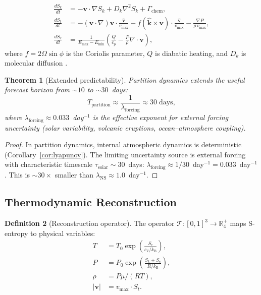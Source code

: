 \documentclass[10pt,twocolumn]{article}
\newtheorem{theorem}{Theorem}[section]
\theoremstyle{definition}
\newtheorem{definition}[theorem]{Definition}
\theoremstyle{remark}
\newcommand{\R}{\mathbb{R}}
\newcommand{\kB}{k_{\mathrm{B}}}
\newcommand{\Sk}{S_k}
\newcommand{\St}{S_t}
\newcommand{\Se}{S_e}
\begin{document}
\begin{align}
  \frac{d\Sk}{dt}
  &= -\mathbf{v}\cdot\nabla\Sk + D_k\nabla^2\Sk
    + \Gamma_{\mathrm{chem}},\label{eq:dSk}\\
  \frac{d\St}{dt}
  &= -(\mathbf{v}\cdot\nabla)\mathbf{v}\cdot
    \frac{\hat{\mathbf{v}}}{v_{\max}}
    - f(\hat{\mathbf{k}}\times\mathbf{v})\cdot
    \frac{\hat{\mathbf{v}}}{v_{\max}}
    - \frac{\nabla P}{\rho\,v_{\max}},\label{eq:dSt}\\
  \frac{d\Se}{dt}
  &= \frac{1}{E_{\max}-E_{\min}}
    \left(\frac{Q}{c_p}-\frac{P}{\rho}\nabla\cdot\mathbf{v}
    \right),\label{eq:dSe}
\end{align}
where $f=2\Omega\sin\phi$ is the Coriolis parameter, $Q$ is
diabatic heating, and $D_k$ is molecular diffusion
\citep{Holton2013}.

\begin{theorem}[Extended predictability]\label{thm:predict}
Partition dynamics extends the useful forecast horizon from
${\sim}10$ to ${\sim}30$~days:
\begin{equation}\label{eq:predict}
  T_{\mathrm{partition}}
  \approx\frac{1}{\lambda_{\mathrm{forcing}}}
  \approx 30\;\text{days},
\end{equation}
where $\lambda_{\mathrm{forcing}}\approx 0.033$~day$^{-1}$ is
the effective exponent for external forcing uncertainty
(solar variability, volcanic eruptions, ocean--atmosphere
coupling).
\end{theorem}

\begin{proof}
In partition dynamics, internal atmospheric dynamics is
deterministic (Corollary~\ref{cor:lyapunov}).  The limiting
uncertainty source is external forcing with characteristic
timescale $\tau_{\mathrm{solar}}\sim 30$~days:
$\lambda_{\mathrm{forcing}}\approx 1/30$~day$^{-1}=
0.033$~day$^{-1}$.  This is ${\sim}30\times$ smaller than
$\lambda_{\mathrm{NS}}\approx 1.0$~day$^{-1}$.
\end{proof}

\subsection{Thermodynamic Reconstruction}
\label{sec:reconstruction}

\begin{definition}[Reconstruction operator]
\label{def:recon}
The operator $\mathcal{T}:[0,1]^3\to\R^+_4$ maps S-entropy
to physical variables:
\begin{align}
  T &= T_0\exp\!\left(\frac{\Se}{c_V/\kB}\right),
    \label{eq:T_recon}\\
  P &= P_0\exp\!\left(\frac{\Sk+\Se}{R/\kB}\right),
    \label{eq:P_recon}\\
  \rho &= P\mu/(RT),\label{eq:rho_recon}\\
  |\mathbf{v}| &= v_{\max}\cdot\St.\label{eq:v_recon}
\end{align}
\end{definition}
\end{document}
